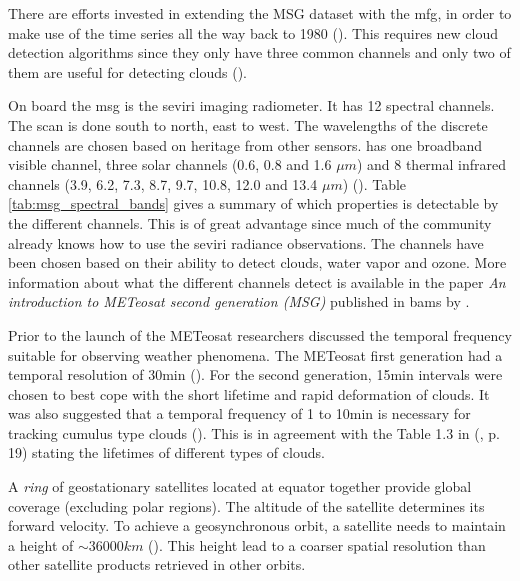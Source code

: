 There are efforts invested in extending the MSG dataset with the \acrfull{mfg}, in order to make use of the time series all the way back to 1980 (\cite{Bojanowski2018PerformanceGenerations}). This requires new cloud detection algorithms since they only have three common channels and only two of them are useful for detecting clouds (\cite{Stockli2019CloudApplications}). 


On board the \acrshort{msg} is the \acrfull{seviri} imaging radiometer. It has 12 spectral channels. The scan is done south to north, east to west. The wavelengths of the discrete channels are chosen based on heritage from other sensors.  has one broadband visible channel, three solar channels (0.6, 0.8 and 1.6 $\mu m$) and 8 thermal infrared channels (3.9, 6.2, 7.3, 8.7, 9.7, 10.8, 12.0 and 13.4 $\mu m$) (\cite{Taravat2015MultilayerMasking}). Table \ref{tab:msg_spectral_bands}
 gives a summary of which properties is detectable by the different channels. 
This is of great advantage since much of the community already knows how to use the \acrshort{seviri} radiance observations. The channels have been chosen based on their ability to detect clouds, water vapor and ozone. More information about what the different channels detect is available in the paper \textit{An introduction to METeosat second generation (MSG)} published in \acrshort{bams} by .

Prior to the launch of the METeosat researchers discussed the temporal frequency suitable for observing weather phenomena. The METeosat first generation had a temporal resolution of 30min (\cite{Stockli2019CloudApplications}). For the second generation, 15min intervals were chosen to best cope with the short lifetime and rapid deformation of clouds. It was also suggested that a temporal frequency of 1 to 10min is necessary for tracking cumulus type clouds (\cite{Schmetz_meteosat_intro}). %
This is in agreement with the Table 1.3 in \citeauthor{lohmann2016} (\citeyear{lohmann2016}, p. 19) stating the lifetimes of different types of clouds.

A \textit{ring} of geostationary satellites located at equator together provide global coverage (excluding polar regions). The altitude of the satellite determines its forward velocity. To achieve a geosynchronous orbit, a satellite needs to maintain a height of $\sim 36 000km$ (\cite{Bley2013ASEVIRI}). This height lead to a coarser spatial resolution than other satellite products retrieved in other orbits. 

